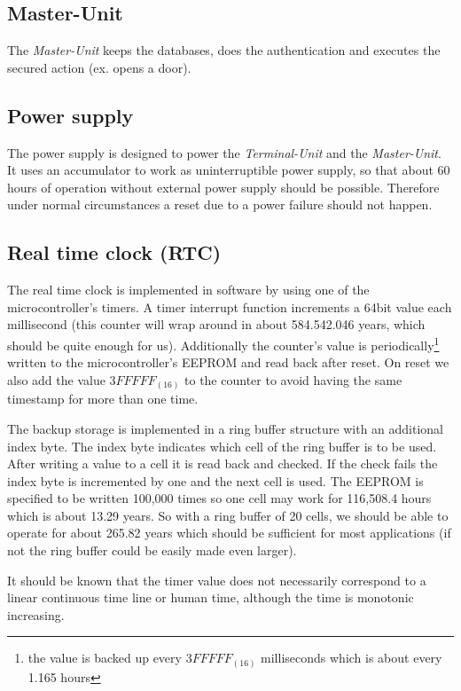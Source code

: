 \subsection{Master-Unit}
The \textit{Master-Unit} keeps the databases, does the authentication and executes the secured action (ex. opens a door).

\subsection{Power supply}
The power supply is designed to power the \textit{Terminal-Unit} and the \textit{Master-Unit}. It uses an accumulator to work as uninterruptible power supply, so that about 60 hours of operation without external power supply should be possible. Therefore under normal circumstances a reset due to a power failure should not happen.

\subsection{Real time clock (RTC)}
The real time clock is implemented in software by using one of the microcontroller's timers. A timer interrupt function increments a 64bit value each millisecond (this counter will wrap around in about 584.542.046 years, which should be quite enough for us). Additionally the counter's value is periodically\footnote{the value is backed up every $3FFFFF_{(16)}$ milliseconds which is about every 1.165 hours} written to the microcontroller's EEPROM and read back after reset. On reset we also add the value $3FFFFF_{(16)}$ to the counter to avoid having the same timestamp for more than one time.

The backup storage is implemented in a ring buffer structure with an additional index byte. 
The index byte indicates which cell of the ring buffer is to be used. After writing a value to a cell it is read back and checked. If the check fails the index byte is incremented by one and the next cell is used. The EEPROM is specified to be written 100,000 times so one cell may work for 116,508.4 hours which is about 13.29 years. So with a ring buffer of 20 cells, we should be able to operate for about 265.82 years which should be sufficient for most applications (if not the ring buffer could be easily made even larger).

It should be known that the timer value does not necessarily correspond to a linear continuous time line or human time, although the time is monotonic increasing. %

